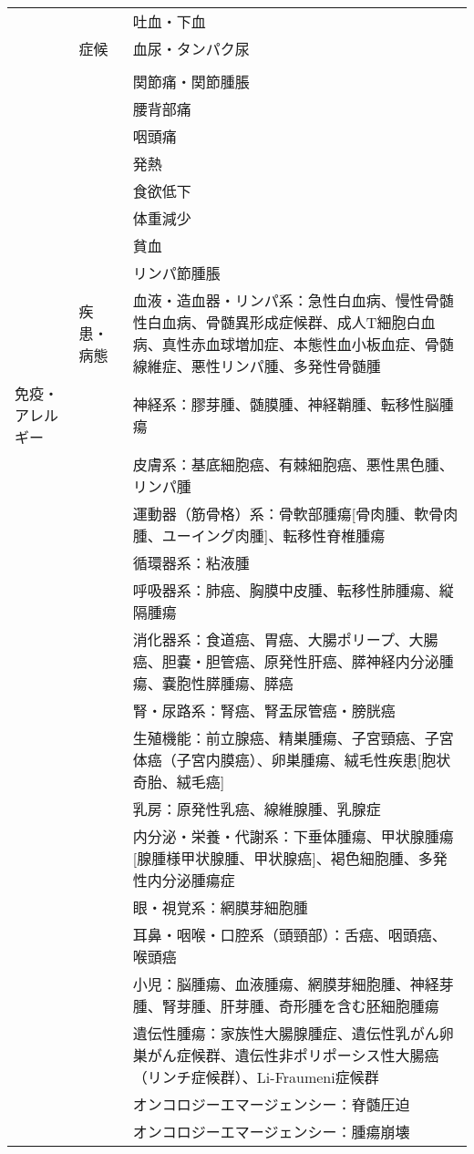 \begin{xltabular}{\linewidth}{XXX}
 &  & 吐血・下血 \\
 & 症候 & 血尿・タンパク尿 \\
 &  &  \\
 &  & 関節痛・関節腫脹 \\
 &  & 腰背部痛 \\
 &  & 咽頭痛 \\
 &  & 発熱 \\
 &  & 食欲低下 \\
 &  & 体重減少 \\
 &  & 貧血 \\
 &  & リンパ節腫脹 \\
 & 疾患・病態 & 血液・造血器・リンパ系：急性白血病、慢性骨髄性白血病、骨髄異形成症候群、成人T細胞白血病、真性赤血球増加症、本態性血小板血症、骨髄線維症、悪性リンパ腫、多発性骨髄腫 \\
免疫・アレルギー &  & 神経系：膠芽腫、髄膜腫、神経鞘腫、転移性脳腫瘍 \\
 &  & 皮膚系：基底細胞癌、有棘細胞癌、悪性黒色腫、リンパ腫 \\
 &  & 運動器（筋骨格）系：骨軟部腫瘍[骨肉腫、軟骨肉腫、ユーイング肉腫]、転移性脊椎腫瘍 \\
 &  & 循環器系：粘液腫 \\
 &  & 呼吸器系：肺癌、胸膜中皮腫、転移性肺腫瘍、縦隔腫瘍 \\
 &  & 消化器系：食道癌、胃癌、大腸ポリープ、大腸癌、胆嚢・胆管癌、原発性肝癌、膵神経内分泌腫瘍、嚢胞性膵腫瘍、膵癌 \\
 &  & 腎・尿路系：腎癌、腎盂尿管癌・膀胱癌 \\
 &  & 生殖機能：前立腺癌、精巣腫瘍、子宮頸癌、子宮体癌（子宮内膜癌）、卵巣腫瘍、絨毛性疾患[胞状奇胎、絨毛癌] \\
 &  & 乳房：原発性乳癌、線維腺腫、乳腺症 \\
 &  & 内分泌・栄養・代謝系：下垂体腫瘍、甲状腺腫瘍[腺腫様甲状腺腫、甲状腺癌]、褐色細胞腫、多発性内分泌腫瘍症 \\
 &  & 眼・視覚系：網膜芽細胞腫 \\
 &  & 耳鼻・咽喉・口腔系（頭頸部）：舌癌、咽頭癌、喉頭癌 \\
 &  & 小児：脳腫瘍、血液腫瘍、網膜芽細胞腫、神経芽腫、腎芽腫、肝芽腫、奇形腫を含む胚細胞腫瘍 \\
 &  & 遺伝性腫瘍：家族性大腸腺腫症、遺伝性乳がん卵巣がん症候群、遺伝性非ポリポーシス性大腸癌（リンチ症候群）、Li-Fraumeni症候群 \\
 &  & オンコロジーエマージェンシー：脊髄圧迫 \\
 &  & オンコロジーエマージェンシー：腫瘍崩壊 \\

\end{xltabular}
